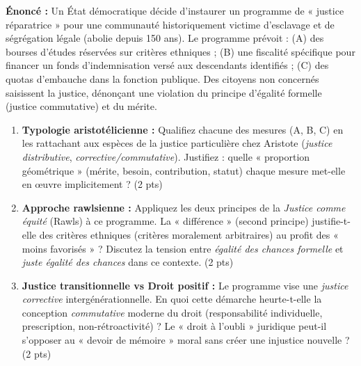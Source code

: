 \documentclass[11pt]{article}
\begin{document}
\begin{exercice}
\textbf{Énoncé :} Un État démocratique décide d'instaurer un programme de « justice réparatrice » pour une communauté historiquement victime d'esclavage et de ségrégation légale (abolie depuis 150 ans). Le programme prévoit : (A) des bourses d'études réservées sur critères ethniques ; (B) une fiscalité spécifique pour financer un fonds d'indemnisation versé aux descendants identifiés ; (C) des quotas d'embauche dans la fonction publique. Des citoyens non concernés saisissent la justice, dénonçant une violation du principe d'égalité formelle (justice commutative) et du mérite.

\begin{enumerate}
    \item \textbf{Typologie aristotélicienne :} Qualifiez chacune des mesures (A, B, C) en les rattachant aux espèces de la justice particulière chez Aristote (\textit{justice distributive}, \textit{corrective/commutative}). Justifiez : quelle « proportion géométrique » (mérite, besoin, contribution, statut) chaque mesure met-elle en œuvre implicitement ? (2 pts)
    \item \textbf{Approche rawlsienne :} Appliquez les deux principes de la \textit{Justice comme équité} (Rawls) à ce programme. La « différence » (second principe) justifie-t-elle des critères ethniques (critères moralement arbitraires) au profit des « moins favorisés » ? Discutez la tension entre \textit{égalité des chances formelle} et \textit{juste égalité des chances} dans ce contexte. (2 pts)
    \item \textbf{Justice transitionnelle vs Droit positif :} Le programme vise une \textit{justice corrective} intergénérationnelle. En quoi cette démarche heurte-t-elle la conception \textit{commutative} moderne du droit (responsabilité individuelle, prescription, non-rétroactivité) ? Le « droit à l'oubli » juridique peut-il s'opposer au « devoir de mémoire » moral sans créer une injustice nouvelle ? (2 pts)
\end{enumerate}
\end{exercice}
\end{document}
